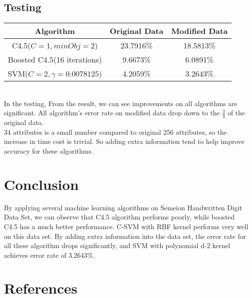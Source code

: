 \documentclass[a4paper,11pt]{article}
\begin{document}
\subsection{Testing}
\vspace{0.5cm}
\begin{tabular}{c c c}
Algorithm		&	Original Data	&Modified Data\\
\hline \hline
C4.5($C=1, minObj=2$)         &23.7916\%		& 18.5813\%\\
Boosted C4.5(16 iterations)	&9.6673\%		& 6.0891\%\\
SVM($C=2, \gamma=0.0078125$)	      &4.2059\%       & 3.2643\%\\
\end{tabular}
\vspace{0.5cm}\\
In the testing, From the result, we can see improvements on all algorithms are significant. All algorithm's error rate on modified data drop down to the $\frac{3}{4}$ of the original data.\\
 34 attributes is a small number compared to original 256 attributes, so the increase in time cost is trivial. So adding extra information tend to help improve accuracy for these algorithms.
\section{Conclusion}
By applying several machine learning algorithms on Semeion Handwritten Digit Data Set, we can observe that C4.5 algorithm performs poorly, while boosted C4.5 has a much better performance. C-SVM with RBF kernel performs very well on this data set. By adding extra information into the data set, the error rate for all these algorithm drops significantly, and SVM with polynomial d-2 kernel achieves error rate of 3.2643\%.
\section{References}
\end{document}
